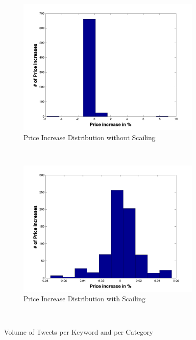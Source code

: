 \begin{figure}[ht]
        \centering
        \begin{subfigure}[b]{0.5\textwidth}
                \includegraphics[width=\textwidth]{img/model/p_increase_n_log}
                \caption{Price Increase Distribution without Scailing}
                \label{fig:u_linear}
        \end{subfigure}%
        ~ %
        \begin{subfigure}[b]{0.5\textwidth}
                \includegraphics[width=\textwidth]{img/model/p_increase_w}
                \caption{Price Increase Distribution with Scailing}
                \label{fig:u_log}
        \end{subfigure}
        ~ %

      
        \caption{Volume of Tweets per Keyword and per Category}\label{fig:distribution}
\end{figure}





